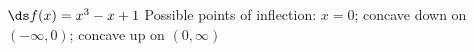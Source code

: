 {$\ds f(x) = x^3-x+1$
}
{Possible points of inflection: $x=0$;
concave down on $(-\infty,0)$;
concave up on $(0,\infty)$
}
